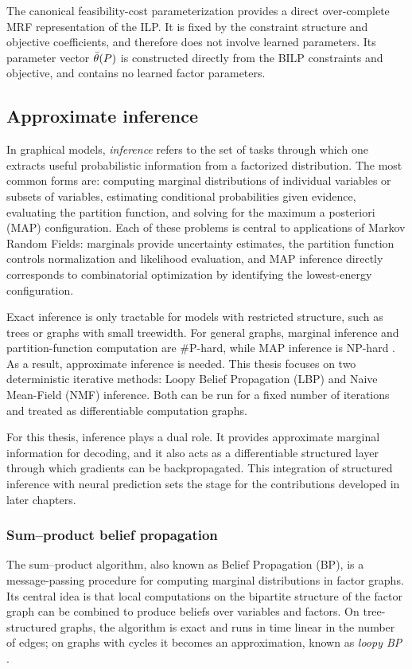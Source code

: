 The canonical feasibility-cost parameterization provides a direct over-complete MRF representation of the ILP. It is fixed by the constraint structure and objective coefficients, and therefore does not involve learned parameters. Its parameter vector $\bar{\theta}(P)$ is constructed directly from the BILP constraints and objective, and contains no learned factor parameters.

\subsection{Approximate inference}
\label{subsec:background_approximate_inference}

In graphical models, \emph{inference} refers to the set of tasks through which one extracts useful probabilistic information from a factorized distribution. The most common forms are: computing marginal distributions of individual variables or subsets of variables, estimating conditional probabilities given evidence, evaluating the partition function, and solving for the maximum a posteriori (MAP) configuration. Each of these problems is central to applications of Markov Random Fields: marginals provide uncertainty estimates, the partition function controls normalization and likelihood evaluation, and MAP inference directly corresponds to combinatorial optimization by identifying the lowest-energy configuration.

Exact inference is only tractable for models with restricted structure, such as trees or graphs with small treewidth. For general graphs, marginal inference and partition-function computation are \#P-hard, while MAP inference is NP-hard \citep{chandrasekaran_complexity_2008,schrijver_combinatorial_2003}. As a result, approximate inference is needed. This thesis focuses on two deterministic iterative methods: Loopy Belief Propagation (LBP) and Naive Mean-Field (NMF) inference. Both can be run for a fixed number of iterations and treated as differentiable computation graphs.

For this thesis, inference plays a dual role. It provides approximate marginal information for decoding, and it also acts as a differentiable structured layer through which gradients can be backpropagated. This integration of structured inference with neural prediction sets the stage for the contributions developed in later chapters.


\subsubsection{Sum--product belief propagation}
\label{subsec:background_lbp}
The sum--product algorithm, also known as Belief Propagation (BP), is a message-passing procedure for computing marginal distributions in factor graphs. Its central idea is that local computations on the bipartite structure of the factor graph can be combined to produce beliefs over variables and factors. On tree-structured graphs, the algorithm is exact and runs in time linear in the number of edges; on graphs with cycles it becomes an approximation, known as \emph{loopy BP} \citep{yedidia_understanding_2003,kschischang_factor_2001}.

